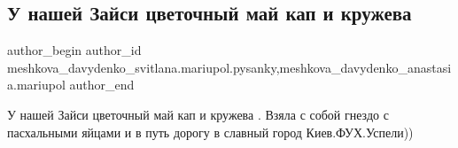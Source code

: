  
 
 
 
 

\subsection{У нашей Зайси цветочный май кап и кружева}
\label{sec:31_03_2018.fb.meshkova_davydenko_svitlana.mariupol.pysanky.1.u_nashej_zajsi_cvetochnyj_maj_kap_i_kruzheva}
 
\ifcmt
 author_begin
   author_id meshkova_davydenko_svitlana.mariupol.pysanky,meshkova_davydenko_anastasia.mariupol
 author_end
\fi

У нашей Зайси цветочный май кап и кружева . Взяла с собой гнездо с пасхальными
яйцами и в путь дорогу в славный город Киев.ФУХ.Успели))
